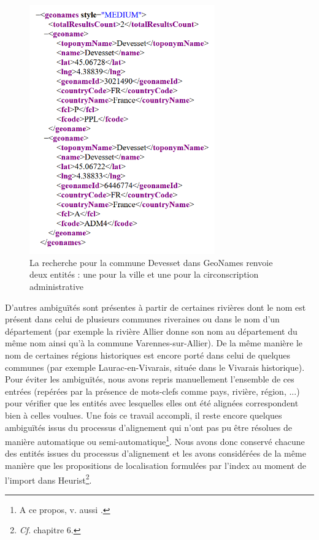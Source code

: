 \documentclass[a4paper,12pt,twoside]{book}
\begin{document}
	\begin{figure}
		\centering
		\includegraphics[width=8cm]{Images/town_on_geonames.png}
		\caption{La recherche pour la commune \og Devesset\fg{} dans GeoNames renvoie deux entités : une pour la ville et une pour la circonscription administrative}
		\label{Double_retour_GeoNames}
	\end{figure}
	
	 D'autres ambiguïtés sont présentes à partir de certaines rivières dont le nom est présent dans celui de plusieurs communes riveraines ou dans le nom d'un département (par exemple la rivière Allier donne son nom au département du même nom ainsi qu'à la commune Varennes-sur-Allier). De la même manière le nom de certaines régions historiques est encore porté dans celui de quelques communes (par exemple Laurac-en-Vivarais, située dans le Vivarais historique). Pour éviter les ambiguïtés, nous avons repris manuellement l'ensemble de ces entrées (repérées par la présence de mots-clefs comme \og pays\fg{}, \og rivière\fg{}, \og région\fg{}, ...) pour vérifier que les entités avec lesquelles elles ont été alignées correspondent bien à celles voulues. Une fois ce travail accompli, il reste encore quelques ambiguïtés issus du processus d'alignement qui n'ont pas pu être résolues de manière automatique ou semi-automatique\footnote{A ce propos, v. aussi \cite{reignier_lindex_2022}.}. Nous avons donc conservé chacune des entités issues du processus d'alignement et les avons considérées de la même manière que les propositions de localisation formulées par l'index au moment de l'import dans Heurist\footnote{\textit{Cf}. chapitre 6.}.
	
\end{document}
